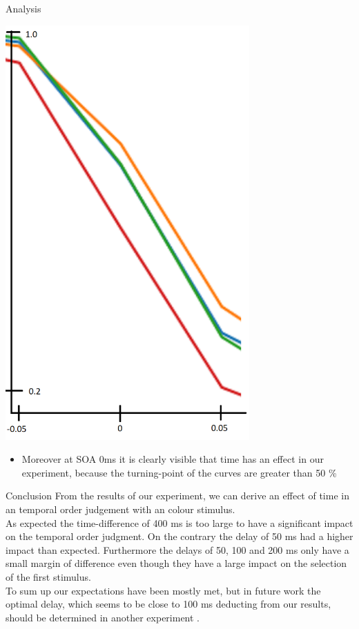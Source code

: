 \documentclass[a0paper,portrait]{baposter}
\begin{document}
\begin{poster}
\begin{posterbox}[name=results,span=1,column=2,row=0]{Analysis}
			\begin{center}
				\includegraphics[width=0.7\textwidth]{imgs/data_extract1.png}
			\end{center}
			
			\begin{itemize}
				\item Moreover at SOA 0ms it is clearly visible that time has an effect in our experiment, because the turning-point of the curves are greater than 50 \%
			\end{itemize}
			
		\end{posterbox}
		
		\begin{posterbox}[name=conclusion,span=1,column=2,row=2,below=results]{Conclusion}
			From the results of our experiment, we can derive an effect of time in an temporal order judgement with an colour stimulus.\\
			As expected the time-difference of 400 ms is too large to have a significant impact on the temporal order judgment. On the contrary the delay of 50 ms had a higher impact than expected. Furthermore the delays of 50, 100 and 200 ms only have a small margin of difference even though they have a large impact on the selection of the first stimulus.\\
			To sum up our expectations have been mostly met, but in future work the optimal delay, which seems to be close to 100 ms deducting from our results, should be determined in another experiment .
			\vspace{18pt}
		\end{posterbox}
		

\end{poster}
\end{document}

